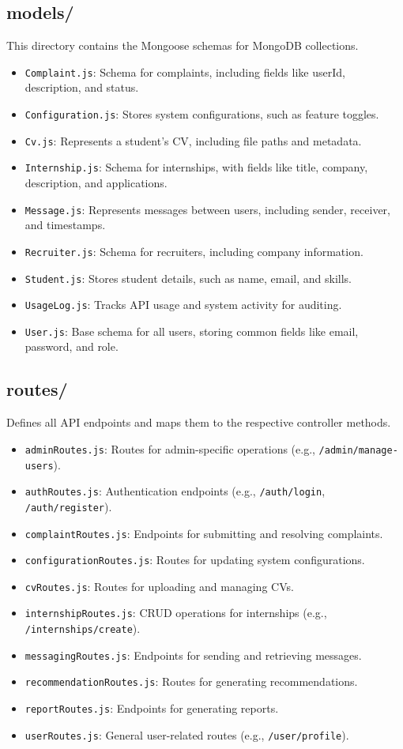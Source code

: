 \subsection{models/}
This directory contains the Mongoose schemas for MongoDB collections.
\begin{itemize}
    \item \texttt{Complaint.js}: Schema for complaints, including fields like userId, description, and status.
    \item \texttt{Configuration.js}: Stores system configurations, such as feature toggles.
    \item \texttt{Cv.js}: Represents a student's CV, including file paths and metadata.
    \item \texttt{Internship.js}: Schema for internships, with fields like title, company, description, and applications.
    \item \texttt{Message.js}: Represents messages between users, including sender, receiver, and timestamps.
    \item \texttt{Recruiter.js}: Schema for recruiters, including company information.
    \item \texttt{Student.js}: Stores student details, such as name, email, and skills.
    \item \texttt{UsageLog.js}: Tracks API usage and system activity for auditing.
    \item \texttt{User.js}: Base schema for all users, storing common fields like email, password, and role.
\end{itemize}

\subsection{routes/}
Defines all API endpoints and maps them to the respective controller methods.
\begin{itemize}
    \item \texttt{adminRoutes.js}: Routes for admin-specific operations (e.g., \texttt{/admin/manage-users}).
    \item \texttt{authRoutes.js}: Authentication endpoints (e.g., \texttt{/auth/login}, \texttt{/auth/register}).
    \item \texttt{complaintRoutes.js}: Endpoints for submitting and resolving complaints.
    \item \texttt{configurationRoutes.js}: Routes for updating system configurations.
    \item \texttt{cvRoutes.js}: Routes for uploading and managing CVs.
    \item \texttt{internshipRoutes.js}: CRUD operations for internships (e.g., \texttt{/internships/create}).
    \item \texttt{messagingRoutes.js}: Endpoints for sending and retrieving messages.
    \item \texttt{recommendationRoutes.js}: Routes for generating recommendations.
    \item \texttt{reportRoutes.js}: Endpoints for generating reports.
    \item \texttt{userRoutes.js}: General user-related routes (e.g., \texttt{/user/profile}).
\end{itemize}

